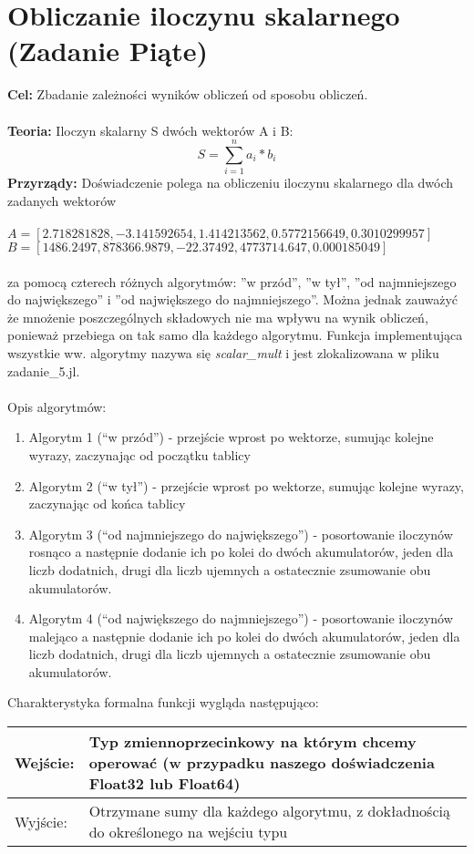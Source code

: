 \documentclass{article}
\begin{document}
\section{Obliczanie iloczynu skalarnego (Zadanie Piąte)}
\noindent \textbf{Cel:} Zbadanie zależności wyników obliczeń od sposobu obliczeń. \\\\
\noindent \textbf{Teoria:} Iloczyn skalarny S dwóch wektorów A i B:
$$S = \sum_{i=1}^{n}a_{i}*b_{i}$$
\noindent \textbf{Przyrządy:} Doświadczenie polega na obliczeniu iloczynu skalarnego dla dwóch zadanych wektorów \\\\
$A= [2.718281828, -3.141592654, 1.414213562, 0.5772156649, 0.3010299957]$ \\
$B= [1486.2497, 878366.9879, -22.37492, 4773714.647, 0.000185049]$\\\\
za pomocą czterech różnych algorytmów:  ”w przód”, ”w tył”, ”od najmniejszego do największego” i ”od największego do najmniejszego”. Można jednak zauważyć że mnożenie poszczególnych składowych nie ma wpływu na wynik obliczeń, ponieważ przebiega on tak samo dla każdego algorytmu. Funkcja implementująca wszystkie ww. algorytmy nazywa się \textit{scalar\_mult} i jest zlokalizowana w pliku zadanie\_5.jl. \\\\
Opis algorytmów:
\begin{enumerate}
\item Algorytm 1 (``w przód'') - przejście wprost po wektorze, sumując kolejne wyrazy, zaczynając od początku tablicy
\item Algorytm 2 (``w tył'') - przejście wprost po wektorze, sumując kolejne wyrazy, zaczynając od końca tablicy
\item Algorytm 3 (``od najmniejszego do największego'') - posortowanie iloczynów rosnąco a następnie dodanie ich po kolei do dwóch akumulatorów, jeden dla liczb dodatnich, drugi dla liczb ujemnych a ostatecznie zsumowanie obu akumulatorów.
\item Algorytm 4 (``od największego do najmniejszego'') - posortowanie iloczynów malejąco a następnie dodanie ich po kolei do dwóch akumulatorów, jeden dla liczb dodatnich, drugi dla liczb ujemnych a ostatecznie zsumowanie obu akumulatorów.
\end{enumerate}
Charakterystyka formalna funkcji wygląda następująco:\\
\begin{center}
  \begin{tabular}{|p{3cm}|p{8cm}|} \hline
    Wejście: & Typ zmiennoprzecinkowy na którym chcemy operować (w przypadku naszego doświadczenia Float32 lub Float64) \\
    \hline \hline
    Wyjście: & Otrzymane sumy dla każdego algorytmu, z dokładnością do określonego na wejściu typu \\
    \hline
  \end{tabular}
\end{center}
\end{document}
